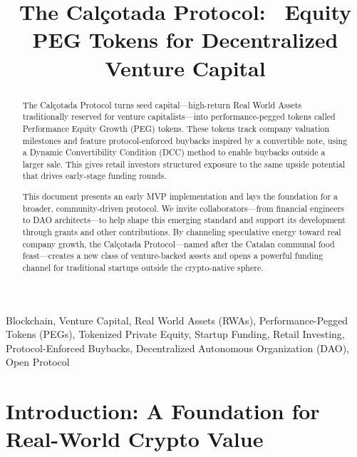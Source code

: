 \documentclass[conference]{IEEEtran}
\begin{document}
\thispagestyle{plain}
\pagestyle{plain}

\title{The Calçotada Protocol: \ Equity PEG Tokens for Decentralized Venture Capital}

\author{
}

\maketitle
\thispagestyle{plain} %

\begin{abstract}
The Calçotada Protocol turns seed capital—high-return Real World Assets traditionally reserved for venture capitalists—into performance-pegged tokens called Performance Equity Growth (PEG) tokens. These tokens track company valuation milestones and feature protocol-enforced buybacks inspired by a convertible note, using a Dynamic Convertibility Condition (DCC) method to enable buybacks outside a larger sale. This gives retail investors structured exposure to the same upside potential that drives early-stage funding rounds.

This document presents an early MVP implementation and lays the foundation for a broader, community-driven protocol. We invite collaborators—from financial engineers to DAO architects—to help shape this emerging standard and support its development through grants and other contributions. By channeling speculative energy toward real company growth, the Calçotada Protocol—named after the Catalan communal food feast—creates a new class of venture-backed assets and opens a powerful funding channel for traditional startups outside the crypto-native sphere.
\end{abstract}

\begin{IEEEkeywords}
Blockchain, Venture Capital, Real World Assets (RWAs), Performance-Pegged Tokens (PEGs), Tokenized Private Equity, Startup Funding, Retail Investing, Protocol-Enforced Buybacks, Decentralized Autonomous Organization (DAO), Open Protocol
\end{IEEEkeywords}

\section{Introduction: A Foundation for Real-World Crypto Value}
\end{document}
